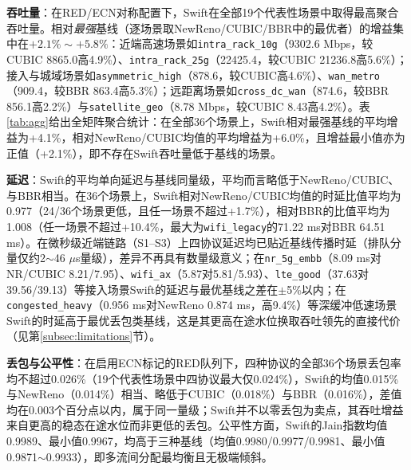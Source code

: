 \documentclass[10pt,twocolumn]{article}
\begin{document}
\textbf{吞吐量}：在RED/ECN对称配置下，Swift在全部19个代表性场景中取得最高聚合吞吐量。相对\emph{最强}基线（逐场景取NewReno/CUBIC/BBR中的最优者）的增益集中在$+2.1\%\sim+5.8\%$：近端高速场景如\texttt{intra\_rack\_10g}（9302.6 Mbps，较CUBIC 8865.0高4.9\%）、\texttt{intra\_rack\_25g}（22425.4，较CUBIC 21236.8高5.6\%）；接入与城域场景如\texttt{asymmetric\_high}（878.6，较CUBIC高4.6\%）、\texttt{wan\_metro}（909.4，较BBR 863.4高5.3\%）；远距离场景如\texttt{cross\_dc\_wan}（874.6，较BBR 856.1高2.2\%）与\texttt{satellite\_geo}（8.78 Mbps，较CUBIC 8.43高4.2\%）。表\ref{tab:agg}给出全矩阵聚合统计：在全部36个场景上，Swift相对最强基线的平均增益为+4.1\%，相对NewReno/CUBIC均值的平均增益为+6.0\%，且增益最小值亦为正值（+2.1\%），即不存在Swift吞吐量低于基线的场景。

\textbf{延迟}：Swift的平均单向延迟与基线同量级，平均而言略低于NewReno/CUBIC、与BBR相当。在36个场景上，Swift相对NewReno/CUBIC均值的时延比值平均为0.977（24/36个场景更低，且任一场景不超过+1.7\%），相对BBR的比值平均为1.008（任一场景不超过+10.4\%，最大为\texttt{wifi\_legacy}的71.22 ms对BBR 64.51 ms）。在微秒级近端链路（S1--S3）上四协议延迟均已贴近基线传播时延（排队分量仅约2$\sim$46 $\mu$s量级），差异不再具有数量级意义；在\texttt{nr\_5g\_embb}（8.09 ms对NR/CUBIC 8.21/7.95）、\texttt{wifi\_ax}（5.87对5.81/5.93）、\texttt{lte\_good}（37.63对39.56/39.13）等接入场景Swift的延迟与最优基线之差在$\pm$5\%以内；在\texttt{congested\_heavy}（0.956 ms对NewReno 0.874 ms，高9.4\%）等深缓冲低速场景Swift的时延高于最优丢包类基线，这是其更高在途水位换取吞吐领先的直接代价（见第\ref{subsec:limitations}节）。

\textbf{丢包与公平性}：在启用ECN标记的RED队列下，四种协议的全部36个场景丢包率均不超过0.026\%（19个代表性场景中四协议最大仅0.024\%），Swift的均值0.015\%与NewReno（0.014\%）相当、略低于CUBIC（0.018\%）与BBR（0.016\%），差值均在0.003个百分点以内，属于同一量级；Swift并不以零丢包为卖点，其吞吐增益来自更高的稳态在途水位而非更低的丢包。公平性方面，Swift的Jain指数均值0.9989、最小值0.9967，均高于三种基线（均值0.9980/0.9977/0.9981、最小值0.9871$\sim$0.9933），即多流间分配最均衡且无极端倾斜。
\end{document}
